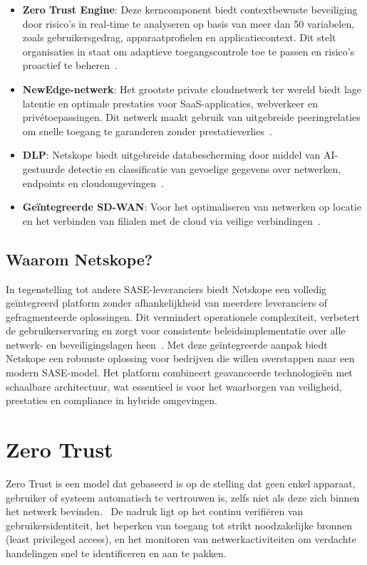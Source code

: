 \begin{itemize}
  \item \textbf{Zero Trust Engine}: Deze kerncomponent biedt contextbewuste beveiliging door risico's in real-time te analyseren op basis van meer dan 50 variabelen, zoals gebruikersgedrag, apparaatprofielen en applicatiecontext. Dit stelt organisaties in staat om adaptieve toegangscontrole toe te passen en risico's proactief te beheren~\autocite{Netskope2025-2}.
  \item \textbf{NewEdge-netwerk}: Het grootste private cloudnetwerk ter wereld biedt lage latentie en optimale prestaties voor SaaS-applicaties, webverkeer en privétoepassingen. Dit netwerk maakt gebruik van uitgebreide peeringrelaties om snelle toegang te garanderen zonder prestatieverlies~\autocite{Netskope2025-1}.
  \item \textbf{DLP}: Netskope biedt uitgebreide databescherming door middel van AI-gestuurde detectie en classificatie van gevoelige gegevens over netwerken, endpoints en cloudomgevingen~\autocite{Netskope2025-1}.
  \item \textbf{Geïntegreerde SD-WAN}: Voor het optimaliseren van netwerken op locatie en het verbinden van filialen met de cloud via veilige verbindingen~\autocite{Netskope2025-1}.
\end{itemize}

\subsection{Waarom Netskope?}
In tegenstelling tot andere SASE-leveranciers biedt Netskope een volledig geïntegreerd platform zonder afhankelijkheid van meerdere leveranciers of gefragmenteerde oplossingen. Dit vermindert operationele complexiteit, verbetert de gebruikerservaring en zorgt voor consistente beleidsimplementatie over alle netwerk- en beveiligingslagen heen~\autocite{Netskope2025-1}.
Met deze geïntegreerde aanpak biedt Netskope een robuuste oplossing voor bedrijven die willen overstappen naar een modern SASE-model. Het platform combineert geavanceerde technologieën met schaalbare architectuur, wat essentieel is voor het waarborgen van veiligheid, prestaties en compliance in hybride omgevingen.

\section{Zero Trust}
Zero Trust is een model dat gebaseerd is op de stelling dat geen enkel apparaat, gebruiker of systeem automatisch te vertrouwen is, zelfs niet als deze zich binnen het netwerk bevinden.~\autocite{Netskope2024} 
De nadruk ligt op het continu verifiëren van gebruikersidentiteit, het beperken van toegang tot strikt noodzakelijke bronnen (least privileged access), en het monitoren van netwerkactiviteiten om verdachte handelingen snel te identificeren en aan te pakken.


